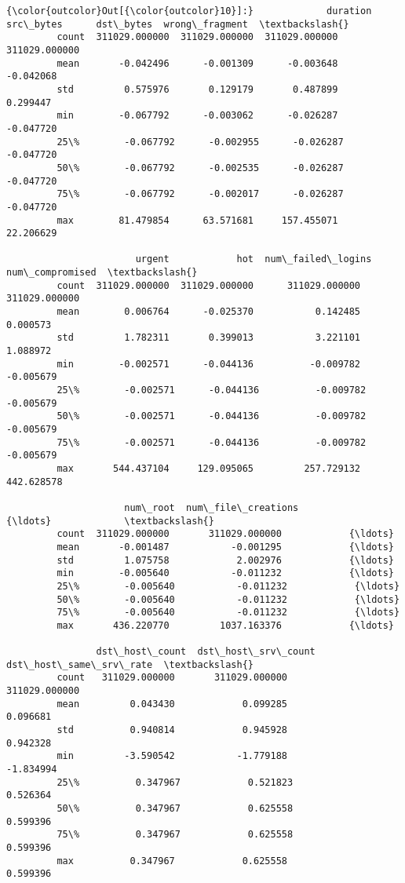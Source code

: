 \documentclass[11pt]{article}
\begin{document}
\begin{Verbatim}[commandchars=\\\{\}]
{\color{outcolor}Out[{\color{outcolor}10}]:}             duration      src\_bytes      dst\_bytes  wrong\_fragment  \textbackslash{}
         count  311029.000000  311029.000000  311029.000000   311029.000000   
         mean       -0.042496      -0.001309      -0.003648       -0.042068   
         std         0.575976       0.129179       0.487899        0.299447   
         min        -0.067792      -0.003062      -0.026287       -0.047720   
         25\%        -0.067792      -0.002955      -0.026287       -0.047720   
         50\%        -0.067792      -0.002535      -0.026287       -0.047720   
         75\%        -0.067792      -0.002017      -0.026287       -0.047720   
         max        81.479854      63.571681     157.455071       22.206629   
         
                       urgent            hot  num\_failed\_logins  num\_compromised  \textbackslash{}
         count  311029.000000  311029.000000      311029.000000    311029.000000   
         mean        0.006764      -0.025370           0.142485         0.000573   
         std         1.782311       0.399013           3.221101         1.088972   
         min        -0.002571      -0.044136          -0.009782        -0.005679   
         25\%        -0.002571      -0.044136          -0.009782        -0.005679   
         50\%        -0.002571      -0.044136          -0.009782        -0.005679   
         75\%        -0.002571      -0.044136          -0.009782        -0.005679   
         max       544.437104     129.095065         257.729132       442.628578   
         
                     num\_root  num\_file\_creations            {\ldots}             \textbackslash{}
         count  311029.000000       311029.000000            {\ldots}              
         mean       -0.001487           -0.001295            {\ldots}              
         std         1.075758            2.002976            {\ldots}              
         min        -0.005640           -0.011232            {\ldots}              
         25\%        -0.005640           -0.011232            {\ldots}              
         50\%        -0.005640           -0.011232            {\ldots}              
         75\%        -0.005640           -0.011232            {\ldots}              
         max       436.220770         1037.163376            {\ldots}              
         
                dst\_host\_count  dst\_host\_srv\_count  dst\_host\_same\_srv\_rate  \textbackslash{}
         count   311029.000000       311029.000000           311029.000000   
         mean         0.043430            0.099285                0.096681   
         std          0.940814            0.945928                0.942328   
         min         -3.590542           -1.779188               -1.834994   
         25\%          0.347967            0.521823                0.526364   
         50\%          0.347967            0.625558                0.599396   
         75\%          0.347967            0.625558                0.599396   
         max          0.347967            0.625558                0.599396   
         

\end{Verbatim}
\end{document}
